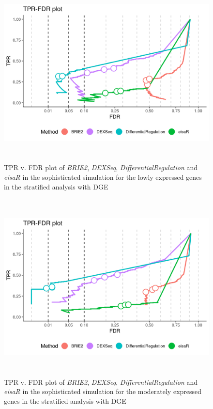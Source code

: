 \begin{figure}[!htb]
\begin{center}
\includegraphics[width=6in,height=3.8in]{../figures/simulation/minnow_simulation_low_DGE_FDR.png}
\end{center}
\caption{TPR v. FDR plot of \emph{BRIE2}, \emph{DEXSeq}, \emph{DifferentialRegulation} and \emph{eisaR} in the sophisticated simulation for the lowly expressed genes in the stratified analysis with DGE}
\label{fig:soph_sim_DGE_FDR_low}
\end{figure}

\begin{figure}[!htb]
\begin{center}
\includegraphics[width=6in,height=3.8in]{../figures/simulation/minnow_simulation_mod_DGE_FDR.png}
\end{center}
\caption{TPR v. FDR plot of \emph{BRIE2}, \emph{DEXSeq}, \emph{DifferentialRegulation} and \emph{eisaR} in the sophisticated simulation for the moderately expressed genes in the stratified analysis with DGE}
\label{fig:soph_sim_DGE_FDR_mod}
\end{figure}


